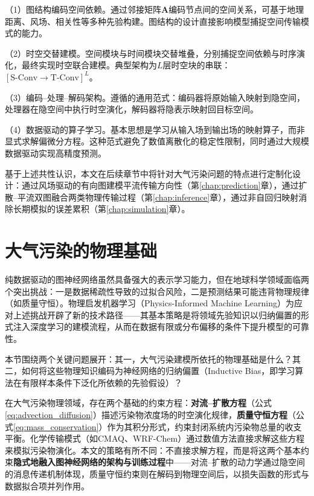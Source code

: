 （1）图结构编码空间依赖。通过邻接矩阵$\mathbf{A}$编码节点间的空间关系，可基于地理距离、风场、相关性等多种先验构建。图结构的设计直接影响模型捕捉空间传输模式的能力。

（2）时空交替建模。空间模块与时间模块交替堆叠，分别捕捉空间依赖与时序演化，最终实现时空联合建模。典型架构为$L$层时空块的串联：$[\text{S-Conv} \rightarrow \text{T-Conv}]^L$。

（3）编码--处理--解码架构。遵循的通用范式：编码器将原始输入映射到隐空间，处理器在隐空间中执行时空演化，解码器将隐表示映射回目标空间。

（4）数据驱动的算子学习。基本思想是学习从输入场到输出场的映射算子，而非显式求解偏微分方程。这种范式避免了数值离散化的稳定性限制，同时通过大规模数据驱动实现高精度预测。

基于上述共性认识，本文在后续章节中将针对大气污染问题的特点进行定制化设计：通过风场驱动的有向图建模平流传输方向性（第\ref{chap:prediction}章），通过扩散--平流双图融合两类物理传输过程（第\ref{chap:inference}章），通过非自回归映射消除长期模拟的误差累积（第\ref{chap:simulation}章）。


\section{大气污染的物理基础}
\label{sec:atmospheric_dynamics}

纯数据驱动的图神经网络虽然具备强大的表示学习能力，但在地球科学领域面临两个突出挑战：一是数据稀疏性导致的过拟合风险，二是预测结果可能违背物理规律（如质量守恒）。物理启发机器学习（Physics-Informed Machine Learning）\citep{karniadakis2021physics,reichstein2019deep}为应对上述挑战开辟了新的技术路径——其基本策略是将领域先验知识以归纳偏置的形式注入深度学习的建模流程，从而在数据有限或分布偏移的条件下提升模型的可靠性。

本节围绕两个关键问题展开：其一，大气污染建模所依托的物理基础是什么？其二，如何将这些物理知识编码为神经网络的归纳偏置（Inductive Bias，即学习算法在有限样本条件下泛化所依赖的先验假设\citep{battaglia2018relational}）？

在大气污染物理领域，存在两个基础的约束方程：\textbf{对流--扩散方程}（公式\eqref{eq:advection_diffusion}）描述污染物浓度场的时空演化规律，\textbf{质量守恒方程}（公式\eqref{eq:mass_conservation}）作为其积分形式，约束封闭系统内污染物总量的收支平衡。化学传输模式（如CMAQ、WRF-Chem）通过数值方法直接求解这些方程来模拟污染物演化。本文的策略有所不同：不直接求解方程，而是将这两个基本约束\textbf{隐式地融入图神经网络的架构与训练过程}中——对流--扩散的动力学通过隐空间的消息传递机制体现，质量守恒约束则在解码到物理空间后，以损失函数的形式与数据拟合项并列作用。

